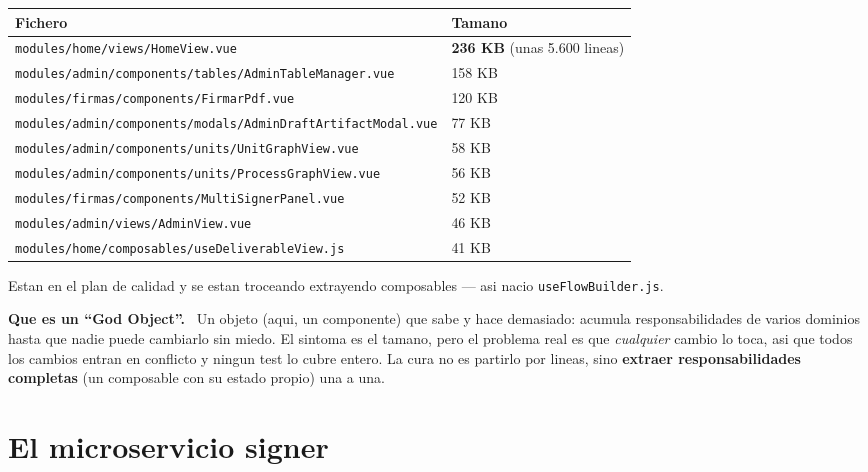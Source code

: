 \documentclass[11pt,a4paper,oneside]{report}
\newenvironment{concepto}[1][Concepto para juniors]{%
  \par\medskip
  \colorlet{shadecolor}{blue!7}%
  \begin{shaded}\noindent\textbf{\color{blue!55!black}#1.}\ \ignorespaces}%
  {\end{shaded}\par\medskip}
\newcommand{\rt}[1]{\texttt{#1}}
\begin{document}
\begin{center}
\footnotesize
\begin{tabularx}{\textwidth}{@{}LP{2.6cm}@{}}
\toprule
\textbf{Fichero} & \textbf{Tamano} \\
\midrule
\rt{modules/home/views/HomeView.vue}                       & \textbf{236 KB} (unas 5.600 lineas) \\
\rt{modules/admin/components/tables/AdminTableManager.vue}  & 158 KB \\
\rt{modules/firmas/components/FirmarPdf.vue}                & 120 KB \\
\rt{modules/admin/components/modals/AdminDraftArtifactModal.vue} & 77 KB \\
\rt{modules/admin/components/units/UnitGraphView.vue}       & 58 KB \\
\rt{modules/admin/components/units/ProcessGraphView.vue}    & 56 KB \\
\rt{modules/firmas/components/MultiSignerPanel.vue}         & 52 KB \\
\rt{modules/admin/views/AdminView.vue}                      & 46 KB \\
\rt{modules/home/composables/useDeliverableView.js}         & 41 KB \\
\bottomrule
\end{tabularx}
\end{center}

Estan en el plan de calidad y se estan troceando extrayendo composables --- asi nacio
\rt{useFlowBuilder.js}.

\begin{concepto}[Que es un ``God Object'']
Un objeto (aqui, un componente) que sabe y hace demasiado: acumula responsabilidades de varios
dominios hasta que nadie puede cambiarlo sin miedo. El sintoma es el tamano, pero el problema
real es que \emph{cualquier} cambio lo toca, asi que todos los cambios entran en conflicto y
ningun test lo cubre entero. La cura no es partirlo por lineas, sino \textbf{extraer
responsabilidades completas} (un composable con su estado propio) una a una.
\end{concepto}

\chapter{El microservicio signer}
\end{document}
